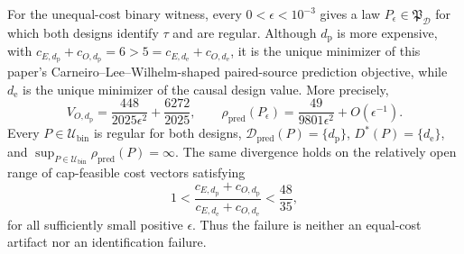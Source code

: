 For the unequal-cost binary witness, every \(0<\epsilon<10^{-3}\) gives a law \(P_\epsilon\in\mathfrak P_{\mathcal D}\) for which both designs identify \(\tau\) and are regular.  Although \(d_{\mathrm p}\) is more expensive, with \(c_{E,d_{\mathrm p}}+c_{O,d_{\mathrm p}}=6>5=c_{E,d_{\mathrm e}}+c_{O,d_{\mathrm e}}\), it is the unique minimizer of this paper's Carneiro--Lee--Wilhelm-shaped paired-source prediction objective, while \(d_{\mathrm e}\) is the unique minimizer of the causal design value.  More precisely,
\[
 V_{O,d_{\mathrm p}}=\frac{448}{2025\epsilon^2}+\frac{6272}{2025},\qquad
 \rho_{\mathrm{pred}}(P_\epsilon)=\frac{49}{9801\epsilon^2}+O(\epsilon^{-1}).
\]
Every \(P\in\mathcal U_{\mathrm{bin}}\) is regular for both designs, \(\mathcal D_{\mathrm{pred}}(P)=\{d_{\mathrm p}\}\), \(D^*(P)=\{d_{\mathrm e}\}\), and \(\sup_{P\in\mathcal U_{\mathrm{bin}}}\rho_{\mathrm{pred}}(P)=\infty\).  The same divergence holds on the relatively open range of cap-feasible cost vectors satisfying
\[
 1<\frac{c_{E,d_{\mathrm p}}+c_{O,d_{\mathrm p}}}
 {c_{E,d_{\mathrm e}}+c_{O,d_{\mathrm e}}}<\frac{48}{35},
\]
for all sufficiently small positive \(\epsilon\).  Thus the failure is neither an equal-cost artifact nor an identification failure.